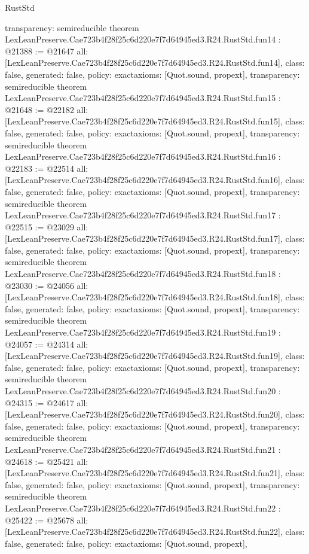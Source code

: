 \begin{lexlean}{RustStd}
\begin{coremodule}
{  transparency: semireducible
}
theorem LexLeanPreserve.Cae723b4f28f25c6d220e7f7d64945ed3.R24.RustStd.fun14 : @21388 := @21647 {
  all: [LexLeanPreserve.Cae723b4f28f25c6d220e7f7d64945ed3.R24.RustStd.fun14],
  class: false,
  generated: false,
  policy: exact{axioms: [Quot.sound, propext]},
  transparency: semireducible
}
theorem LexLeanPreserve.Cae723b4f28f25c6d220e7f7d64945ed3.R24.RustStd.fun15 : @21648 := @22182 {
  all: [LexLeanPreserve.Cae723b4f28f25c6d220e7f7d64945ed3.R24.RustStd.fun15],
  class: false,
  generated: false,
  policy: exact{axioms: [Quot.sound, propext]},
  transparency: semireducible
}
theorem LexLeanPreserve.Cae723b4f28f25c6d220e7f7d64945ed3.R24.RustStd.fun16 : @22183 := @22514 {
  all: [LexLeanPreserve.Cae723b4f28f25c6d220e7f7d64945ed3.R24.RustStd.fun16],
  class: false,
  generated: false,
  policy: exact{axioms: [Quot.sound, propext]},
  transparency: semireducible
}
theorem LexLeanPreserve.Cae723b4f28f25c6d220e7f7d64945ed3.R24.RustStd.fun17 : @22515 := @23029 {
  all: [LexLeanPreserve.Cae723b4f28f25c6d220e7f7d64945ed3.R24.RustStd.fun17],
  class: false,
  generated: false,
  policy: exact{axioms: [Quot.sound, propext]},
  transparency: semireducible
}
theorem LexLeanPreserve.Cae723b4f28f25c6d220e7f7d64945ed3.R24.RustStd.fun18 : @23030 := @24056 {
  all: [LexLeanPreserve.Cae723b4f28f25c6d220e7f7d64945ed3.R24.RustStd.fun18],
  class: false,
  generated: false,
  policy: exact{axioms: [Quot.sound, propext]},
  transparency: semireducible
}
theorem LexLeanPreserve.Cae723b4f28f25c6d220e7f7d64945ed3.R24.RustStd.fun19 : @24057 := @24314 {
  all: [LexLeanPreserve.Cae723b4f28f25c6d220e7f7d64945ed3.R24.RustStd.fun19],
  class: false,
  generated: false,
  policy: exact{axioms: [Quot.sound, propext]},
  transparency: semireducible
}
theorem LexLeanPreserve.Cae723b4f28f25c6d220e7f7d64945ed3.R24.RustStd.fun20 : @24315 := @24617 {
  all: [LexLeanPreserve.Cae723b4f28f25c6d220e7f7d64945ed3.R24.RustStd.fun20],
  class: false,
  generated: false,
  policy: exact{axioms: [Quot.sound, propext]},
  transparency: semireducible
}
theorem LexLeanPreserve.Cae723b4f28f25c6d220e7f7d64945ed3.R24.RustStd.fun21 : @24618 := @25421 {
  all: [LexLeanPreserve.Cae723b4f28f25c6d220e7f7d64945ed3.R24.RustStd.fun21],
  class: false,
  generated: false,
  policy: exact{axioms: [Quot.sound, propext]},
  transparency: semireducible
}
theorem LexLeanPreserve.Cae723b4f28f25c6d220e7f7d64945ed3.R24.RustStd.fun22 : @25422 := @25678 {
  all: [LexLeanPreserve.Cae723b4f28f25c6d220e7f7d64945ed3.R24.RustStd.fun22],
  class: false,
  generated: false,
  policy: exact{axioms: [Quot.sound, propext]},
}
\end{coremodule}
\end{lexlean}
